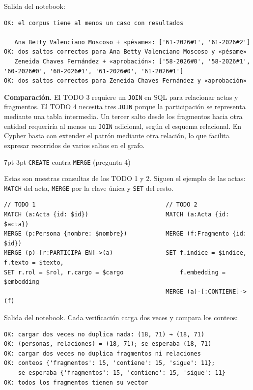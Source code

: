 \documentclass[10pt,letterpaper]{article}
\makeatletter
\renewcommand\section{\@startsection{section}{1}{\z@}%
  {7pt \@plus 2pt \@minus 1pt}{3pt}%
  {\normalfont\normalsize\bfseries\color{acc}}}
\makeatother
\begin{document}
Salida del notebook:
\begin{Verbatim}[fontsize=\scriptsize]
OK: el corpus tiene al menos un caso con resultados

   Ana Betty Valenciano Moscoso + «pésame»: ['61-2026#1', '61-2026#2']
OK: dos saltos correctos para Ana Betty Valenciano Moscoso y «pésame»
   Zeneida Chaves Fernández + «aprobación»: ['58-2026#0', '58-2026#1', '60-2026#0', '60-2026#1', '61-2026#0', '61-2026#1']
OK: dos saltos correctos para Zeneida Chaves Fernández y «aprobación»
\end{Verbatim}

\textbf{Comparación.}
El TODO 3 requiere un \texttt{JOIN} en SQL para
relacionar actas y fragmentos. El TODO 4 necesita
tres \texttt{JOIN} porque la participación se
representa mediante una tabla intermedia.
Un tercer salto desde los fragmentos hacia otra
entidad requeriría al menos un \texttt{JOIN}
adicional, según el esquema relacional.
En Cypher basta con extender el patrón mediante
otra relación, lo que facilita expresar recorridos
de varios saltos en el grafo.

\section{\texttt{CREATE} contra \texttt{MERGE} (pregunta 4)}

Estas son nuestras consultas de los TODO 1 y 2. Siguen el ejemplo de las actas: \texttt{MATCH} del acta,
\texttt{MERGE} por la clave única y \texttt{SET} del resto.
\begin{Verbatim}
// TODO 1                                     // TODO 2
MATCH (a:Acta {id: $id})                      MATCH (a:Acta {id: $acta})
MERGE (p:Persona {nombre: $nombre})           MERGE (f:Fragmento {id: $id})
MERGE (p)-[r:PARTICIPA_EN]->(a)               SET f.indice = $indice, f.texto = $texto,
SET r.rol = $rol, r.cargo = $cargo                f.embedding = $embedding
                                              MERGE (a)-[:CONTIENE]->(f)
\end{Verbatim}
Salida del notebook. Cada verificación carga dos veces y compara los conteos:
\begin{Verbatim}
OK: cargar dos veces no duplica nada: (18, 71) → (18, 71)
OK: (personas, relaciones) = (18, 71); se esperaba (18, 71)
OK: cargar dos veces no duplica fragmentos ni relaciones
OK: conteos {'fragmentos': 15, 'contiene': 15, 'sigue': 11};
    se esperaba {'fragmentos': 15, 'contiene': 15, 'sigue': 11}
OK: todos los fragmentos tienen su vector
\end{Verbatim}
\end{document}
